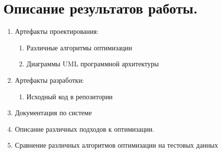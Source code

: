 \documentclass[12pt]{article}
\begin{document}
    \section{Описание результатов работы.}
        \begin{enumerate}\itemsep1pt \parskip0pt 
            \item Артефакты проектирования:
                \begin{enumerate}\itemsep1pt \parskip0pt  
                    \item Различные алгоритмы оптимизации
                    \item Диаграммы UML программной архитектуры
                \end{enumerate}
            \item Артефакты разработки:
                \begin{enumerate}\itemsep1pt \parskip0pt  
                    \item Исходный код в репозитории
                \end{enumerate}
            \item Документация по системе
            \item Описание различных подходов к оптимизации.
            \item Сравнение различных алгоритмов оптимизации на тестовых данных
        \end{enumerate}
\end{document}
